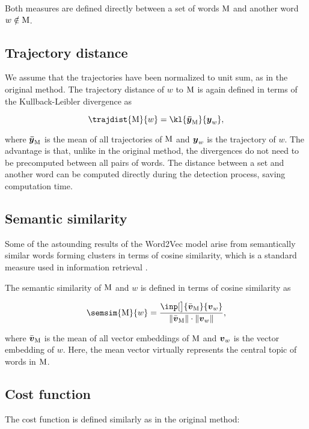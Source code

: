 Both measures are defined directly between a set of words $\text{M}$ and another word $w \notin \text{M}$.

\subsection{Trajectory distance}
We assume that the trajectories have been normalized to unit sum, as in the original method. The trajectory distance of $w$ to $\text{M}$ is again defined in terms of the Kullback-Leibler divergence as

\begin{equation}
	\trajdist{\featset}{w} = \kl{\vect{\bar{\traj}}_{\featset}}{\vect{\traj}_{w}},
\end{equation}

where $\vect{\bar{\traj}}_{\featset}$ is the mean of all trajectories of $\text{M}$ and $\vect{\traj}_{w}$ is the trajectory of $w$. The advantage is that, unlike in the original method, the divergences do not need to be precomputed between all pairs of words. The distance between a set and another word can be computed directly during the detection process, saving computation time.


\subsection{Semantic similarity}
Some of the astounding results of the Word2Vec model arise from semantically similar words forming clusters \citep{linguistic-regularities} in terms of cosine similarity, which is a standard measure used in information retrieval \citep{information-retrieval, cosine-similarity}.

The semantic similarity of $\text{M}$ and $w$ is defined in terms of cosine similarity as

\begin{equation}
	\semsim{\featset}{w} = \frac{\inp[\big]{\bar{\embed}_{\featset}}{\embed_{w}}}{\| \bar{\embed}_{\featset} \| \cdot \| \embed_{w} \|},
\end{equation}

where $\bar{\embed}_{\featset}$ is the mean of all vector embeddings of $\text{M}$ and $\embed_{w}$ is the vector embedding of $w$. Here, the mean vector virtually represents the central topic of words in $\text{M}$.


\subsection{Cost function}
The cost function is defined similarly as in the original method:

